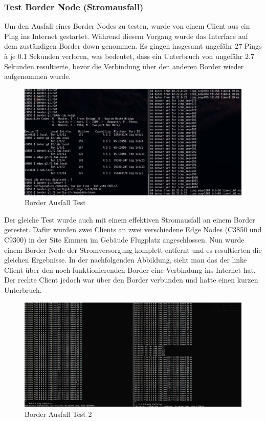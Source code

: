 \subsubsection{Test Border Node (Stromausfall)}
Um den Ausfall eines Border Nodes zu testen, wurde von einem Client aus ein Ping ins Internet gestartet. Während diesem Vorgang wurde das Interface auf dem zuständigen Border down genommen. Es gingen insgesamt ungefähr 27 Pings à je 0.1 Sekunden verloren, was bedeutet, dass ein Unterbruch von ungefähr 2.7 Sekunden resultierte, bevor die Verbindung über den anderen Border wieder aufgenommen wurde. 


\begin{figure}[H]
	\centering
	\includegraphics[width=1\linewidth]{img/Absicherung/border-ausfall-test}
	\caption{Border Ausfall Test}
	\label{fig:Border Ausfall Test}
\end{figure}

Der gleiche Test wurde auch mit einem effektiven Stromausfall an einem Border getestet. Dafür wurden zwei Clients an zwei verschiedene Edge Nodes (C3850 und C9300) in der Site Emmen im Gebäude Flugplatz angeschlossen. Nun wurde einem Border Node der Stromversorgung komplett entfernt und es resultierten die gleichen Ergebnisse. In der nachfolgenden Abbildung, sieht man das der linke Client über den noch funktionierenden Border eine Verbindung ins Internet hat. Der rechte Client jedoch war über den Border verbunden und hatte einen kurzen Unterbruch.

\begin{figure}[H]
	\centering
	\includegraphics[width=1\linewidth]{img/Absicherung/border-ausfall-tes2}
	\caption{Border Ausfall Test 2}
	\label{fig:Border Ausfall Test 2}
\end{figure}

